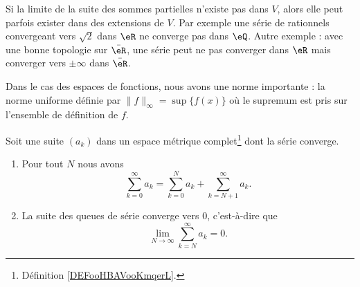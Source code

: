 \begin{remark}
    Si la limite de la suite des sommes partielles n'existe pas dans \( V\), alors elle peut parfois exister dans des extensions de \( V\). Par exemple une série de rationnels convergeant vers \( \sqrt{2}\) dans \( \eR\) ne converge pas dans \( \eQ\). Autre exemple : avec une bonne topologie sur \( \bar \eR\), une série peut ne pas converger dans \( \eR\) mais converger vers \( \pm\infty\) dans \( \bar \eR\).
\end{remark}

Dans le cas des espaces de fonctions, nous avons une norme importante : la norme uniforme définie par \( \| f \|_{\infty}=\sup\{ f(x) \}\) où le supremum est pris sur l'ensemble de définition de \( f\).

\begin{lemma}       \label{LEMooHUZEooSyPipb}
    Soit une suite \( (a_k)\) dans un espace métrique complet\footnote{Définition \ref{DEFooHBAVooKmqerL}.} dont la série converge.
    
    \begin{enumerate}
        \item   \label{ITEMooPFSQooDhKFGL}
            Pour tout \( N\) nous avons
            \begin{equation}
                \sum_{k=0}^{\infty}a_k=\sum_{k=0}^Na_k+\sum_{k=N+1}^{\infty}a_k.
            \end{equation}
        \item       \label{ITEMooQNHMooUPjupB}
            La suite des queues de série converge vers \( 0\), c'est-à-dire que
            \begin{equation}
                \lim_{N\to \infty} \sum_{k=N}^{\infty}a_k=0.
            \end{equation}
    \end{enumerate}
\end{lemma}

